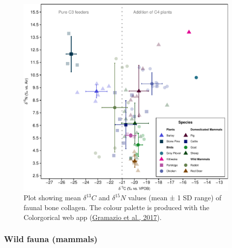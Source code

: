 \documentclass[3p]{elsarticle} %
\begin{document}
\begin{figure}
\includegraphics[width=0.98\textwidth]{castro_main_body_files/figure-latex/fauna-carbnitro-iso-plot-1} \caption{Plot showing mean \(\delta ^{13}C\) and \(\delta ^{15}N\) values (mean ± 1 SD range) of faunal bone collagen. The colour palette is produced with the Colorgorical web app (\protect\hyperlink{ref-gramazio_etal17}{Gramazio et al., 2017}).}\label{fig:fauna-carbnitro-iso-plot}
\end{figure}

\hypertarget{wild-fauna-mammals}{%
\subsubsection{Wild fauna (mammals)}\label{wild-fauna-mammals}}
\end{document}
